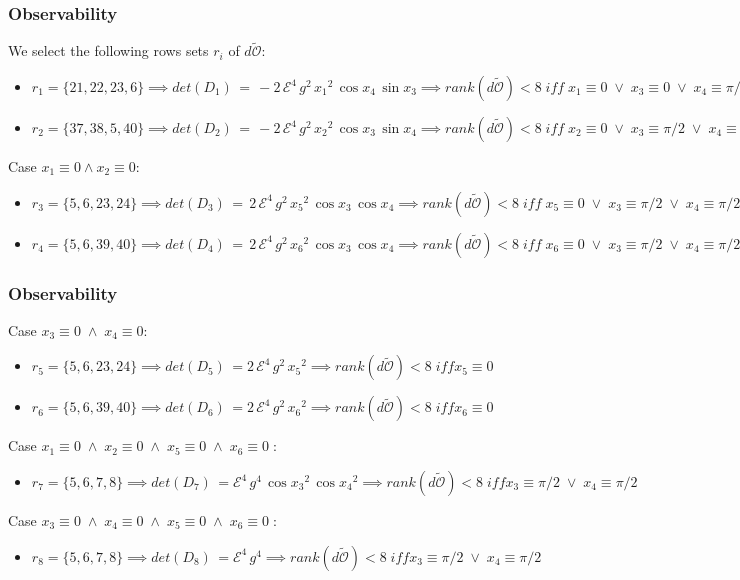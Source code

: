 \begin{frame}
\frametitle{Observability}
We select the following rows sets $r_i$ of $d\tilde{\mathcal{O}}$:
\begin{itemize}
	\item $r_1 = \{21,22,23,6\} \implies det(D_1)\,=\,-2\,\mathcal{E}^4\,g^2\,{x_{1}}^2\,\cos x_{4}\,\sin x_{3} \implies rank(d\tilde{\mathcal{O}})<8\; \mathit{iff} \;x_1\equiv0\; \lor\; x_3\equiv0\; \lor\; x_4\equiv\pi/2$
	\item $r_2 = \{37,38,5,40\} \implies det(D_2)\,=\,-2\,\mathcal{E}^4\,g^2\,{x_{2}}^2\,\cos x_{3}\,\sin x_{4} \implies rank(d\tilde{\mathcal{O}})<8\; \mathit{iff} \;x_2\equiv0\; \lor\; x_3\equiv\pi/2\; \lor\; x_4\equiv0$
	\end{itemize}
	Case $x_1 \equiv 0 \land x_2 \equiv 0$:
	\begin{itemize}
	\item $r_3 = \{5,6,23,24\} \implies det(D_3)\,=\,2\,\mathcal{E}^4\,g^2\,{x_{5}}^2\,\cos x_{3}\,\cos x_{4} \implies rank(d\tilde{\mathcal{O}})<8\; \mathit{iff} \;x_5\equiv0\; \lor\; x_3\equiv\pi/2\; \lor\; x_4\equiv\pi/2$
	\item $r_4 = \{5,6,39,40\} \implies det(D_4)\,=\,2\,\mathcal{E}^4\,g^2\,{x_{6}}^2\,\cos x_{3}\,\cos x_{4} \implies rank(d\tilde{\mathcal{O}})<8\; \mathit{iff} \;x_6\equiv0\; \lor\; x_3\equiv\pi/2\; \lor\; x_4\equiv\pi/2$
	\end{itemize}
\end{frame}
%
\begin{frame}
\frametitle{Observability}
	Case $x_3 \equiv 0\; \land\; x_4 \equiv 0$:
	\begin{itemize}
	\item $r_5 = \{5,6,23,24\} \implies det(D_5)\,=2\,\mathcal{E}^4\,g^2\,{x_{5}}^2 \implies rank(d\tilde{\mathcal{O}})<8\; \mathit{iff} x_5\equiv0$
	\item $r_6 = \{5,6,39,40\} \implies det(D_6)\,=2\,\mathcal{E}^4\,g^2\,{x_{6}}^2 \implies rank(d\tilde{\mathcal{O}})<8\; \mathit{iff} x_6\equiv0$
	\end{itemize}
	Case $x_1 \equiv 0\; \land\; x_2 \equiv 0\; \land\; x_5 \equiv 0\; \land\; x_6 \equiv 0\;$:
	\begin{itemize}
	\item $r_7 = \{5,6,7,8\} \implies det(D_7)\,=\mathcal{E}^4\,g^4\,{\cos x_{3}}^2\,{\cos x_{4}}^2 \implies rank(d\tilde{\mathcal{O}})<8\; \mathit{iff} x_3\equiv\pi/2\; \lor\; x_4\equiv\pi/2$
	\end{itemize}
	Case $x_3 \equiv 0\; \land\; x_4 \equiv 0\; \land\; x_5 \equiv 0\; \land\; x_6 \equiv 0\;$:
	\begin{itemize}
	\item $r_8 = \{5,6,7,8\} \implies det(D_8)\,=\mathcal{E}^4\,g^4 \implies rank(d\tilde{\mathcal{O}})<8\; \mathit{iff} x_3\equiv\pi/2\; \lor\; x_4\equiv\pi/2$
	\end{itemize}

\end{frame}
